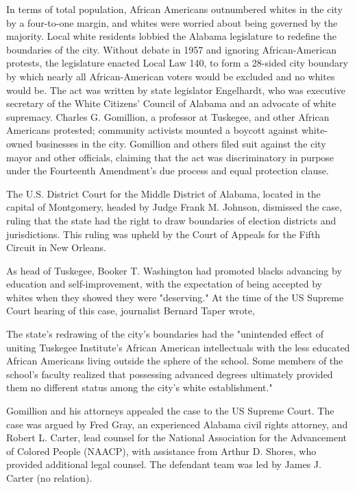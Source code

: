 In terms of total population, African Americans outnumbered whites in
the city by a four-to-one margin, and whites were worried about being
governed by the majority. Local white residents lobbied the Alabama
legislature to redefine the boundaries of the city. Without debate in
1957 and ignoring African-American protests, the legislature enacted
Local Law 140, to form a 28-sided city boundary by which nearly all
African-American voters would be excluded and no whites would be. The
act was written by state legislator Engelhardt, who was executive
secretary of the White Citizens' Council of Alabama and an advocate of
white supremacy. Charles G. Gomillion, a professor at Tuskegee, and
other African Americans protested; community activists mounted a boycott
against white-owned businesses in the city. Gomillion and others filed
suit against the city mayor and other officials, claiming that the act
was discriminatory in purpose under the Fourteenth Amendment's due
process and equal protection clause.

The U.S. District Court for the Middle District of Alabama, located in
the capital of Montgomery, headed by Judge Frank M. Johnson, dismissed
the case, ruling that the state had the right to draw boundaries of
election districts and jurisdictions. This ruling was upheld by the
Court of Appeals for the Fifth Circuit in New Orleans.

As head of Tuskegee, Booker T. Washington had promoted blacks advancing
by education and self-improvement, with the expectation of being
accepted by whites when they showed they were "deserving." At the time
of the US Supreme Court hearing of this case, journalist Bernard Taper
wrote,

The state's redrawing of the city's boundaries had the "unintended
effect of uniting Tuskegee Institute's African American intellectuals
with the less educated African Americans living outside the sphere of
the school. Some members of the school's faculty realized that
possessing advanced degrees ultimately provided them no different status
among the city's white establishment."

Gomillion and his attorneys appealed the case to the US Supreme Court.
The case was argued by Fred Gray, an experienced Alabama civil rights
attorney, and Robert L. Carter, lead counsel for the National
Association for the Advancement of Colored People (NAACP), with
assistance from Arthur D. Shores, who provided additional legal counsel.
The defendant team was led by James J. Carter (no relation).

